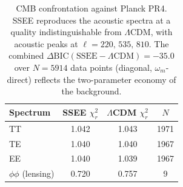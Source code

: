 \documentclass[a4paper,11pt]{article}
\begin{document}
\begin{table}[t]
  \centering
  \begin{tabular}{lccc}
    \toprule
    Spectrum & SSEE $\chi^2_r$ & $\Lambda$CDM $\chi^2_r$ & $N$ \\
    \midrule
    TT          & 1.042 & 1.043 & 1971 \\
    TE          & 1.040 & 1.040 & 1967 \\
    EE          & 1.040 & 1.039 & 1967 \\
    $\phi\phi$ (lensing) & 0.720 & 0.757 & 9 \\
    \bottomrule
  \end{tabular}
  \caption{CMB confrontation against Planck PR4. SSEE reproduces the acoustic
  spectra at a quality indistinguishable from $\Lambda$CDM, with acoustic peaks
  at $\ell=220,\,535,\,810$. The combined $\Delta\mathrm{BIC}
  (\text{SSEE}-\Lambda\text{CDM})=-35.0$ over $N=5914$ data points (diagonal,
  $\omega_m$-direct) reflects the two-parameter economy of the background.}
  \label{tab:cmb}
\end{table}
\end{document}

